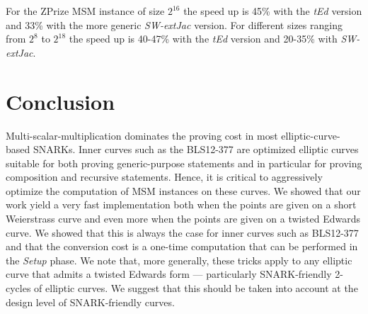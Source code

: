 \documentclass[journal=tches,spthm]{iacrtrans}
\newcommand{\MBlue}{blue}
\newcommand{\MOrange}{orange}
\newcommand{\MGreen}{green!80!black}
\begin{document}
\begin{figure}[htb]
\begin{sffamily}
\begin{scriptsize}
\end{scriptsize}
\end{sffamily}
\end{figure}

For the ZPrize MSM instance of size $2^{16}$ the speed up is 45\% with the
\textit{tEd} version and 33\% with the more generic \textit{SW-extJac}
version. For different sizes ranging from $2^8$ to $2^{18}$ the speed up
is 40-47\% with the \textit{tEd} version and 20-35\% with \textit{SW-extJac}.

\section{Conclusion}
Multi-scalar-multiplication dominates the proving cost in most
elliptic-curve-based SNARKs.  Inner curves such as the BLS12-377 are optimized
elliptic curves suitable for both proving generic-purpose statements and in
particular for proving composition and recursive statements.  Hence, it is
critical to aggressively optimize the computation of MSM instances on these
curves.  We showed that our work yield a very fast implementation both when the
points are given on a short Weierstrass curve and even more when the points are
given on a twisted Edwards curve. We showed that this is always the case for
inner curves such as BLS12-377 and that the conversion cost is a one-time
computation that can be performed in the \textit{Setup} phase. We note that,
more generally, these tricks apply to any elliptic curve that admits a twisted
Edwards form — particularly SNARK-friendly 2-cycles of elliptic curves. We
suggest that this should be taken into account at the design level of
SNARK-friendly curves.
\end{document}
